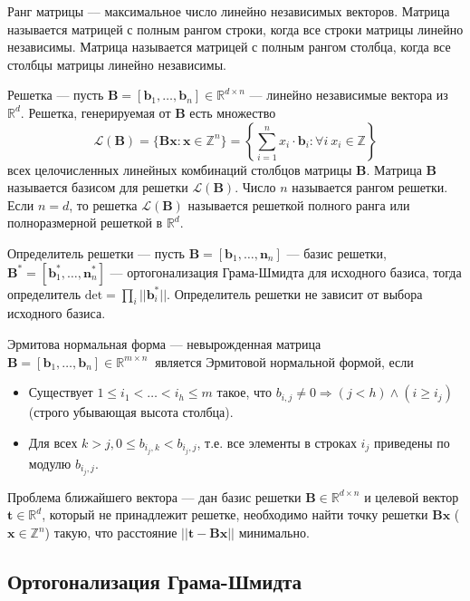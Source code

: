 Ранг матрицы –-- максимальное число линейно независимых векторов. Матрица называется матрицей с полным рангом строки, когда все строки матрицы линейно независимы. Матрица называется матрицей с полным рангом столбца, когда все столбцы матрицы линейно независимы.

Решетка --- пусть $ \mathbf{B} = [\mathbf{b}_1, \ldots, \mathbf{b}_n] \in \mathbb{R}^{d \times n} $ --- линейно независимые вектора из $ \mathbb{R}^d $. Решетка, генерируемая от $\mathbf{B}$ есть множество $$ \mathcal{L}(\mathbf{B}) = \lbrace \mathbf{Bx}: \mathbf{x} \in \mathbb{Z}^n \rbrace = \left\{ \sum\limits_{i=1}^n x_i \cdot \mathbf{b}_i: \forall i \ x_i \in \mathbb{Z} \right\} $$
всех целочисленных линейных комбинаций столбцов матрицы $\mathbf{B}$. Матрица $\mathbf{B}$ называется базисом для решетки $\mathcal{L}(\mathbf{B})$. Число $n$ называется рангом решетки. Если $n = d$, то решетка $\mathcal{L}(\mathbf{B})$ называется решеткой полного ранга или полноразмерной решеткой в $\mathbb{R}^d$. 

Определитель решетки --- пусть $ \mathbf{B} = \left[\mathbf{b}_1, \ldots, \mathbf{n}_n \right] $ --- базис решетки, $ \mathbf{B}^* = \left[\mathbf{b}^*_1, \ldots, \mathbf{n}^*_n \right] $ --- ортогонализация Грама-Шмидта для исходного базиса, тогда определитель $\mathrm{det} = \prod_i ||\mathbf{b}^*_i||$. Определитель решетки не зависит от выбора исходного базиса.

Эрмитова нормальная форма --- невырожденная матрица $ \mathbf{B}=\left[\mathbf{b}_1, \ldots, \mathbf{b}_n\right] \in \mathbb{R}^{m \times n}\ $ является Эрмитовой нормальной формой, если

\begin{itemize}
\item Существует $ 1 \le i_1 < \ldots < i_h \le m $ такое, что $ b_{i,j} \neq 0 \Rightarrow (j < h) \land (i \geq i_j) $ (строго убывающая высота столбца).
\item Для всех $ k>j, 0 \le b_{{i_j,k}}<b_{i_j,j} $, т.е. все элементы в строках $ i_j $ приведены по модулю $ b_{i_j, j} $.
\end{itemize}

Проблема ближайшего вектора --- дан базис решетки $ \mathbf{B} \in \mathbb{R}^{d \times n} $ и целевой вектор $ \mathbf{t} \in \mathbb{R}^d $, который не принадлежит решетке, необходимо найти точку решетки $ \mathbf{Bx} $ ($ \mathbf{x} \in \mathbb{Z}^n $) такую, что расстояние $ ||\mathbf{t} - \mathbf{Bx}|| $ минимально. 

\subsection{Ортогонализация Грама-Шмидта}

